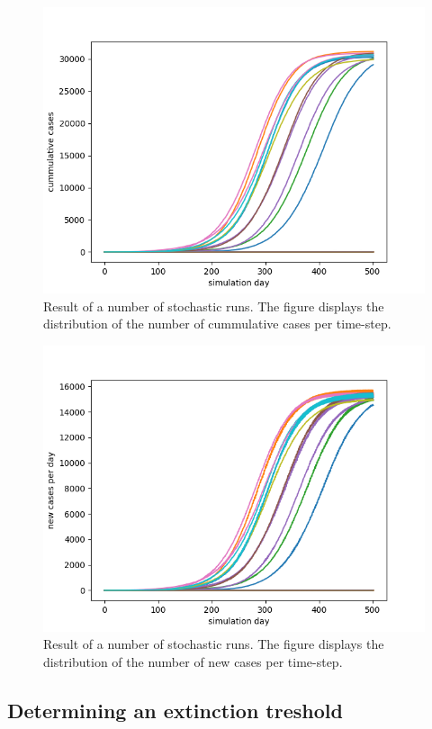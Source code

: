 \documentclass[runningheads]{llncs}
\begin{document}
\begin{figure}
	\includegraphics[width=\textwidth]{fig1.png}
	\caption{Result of a number of stochastic runs. The figure displays the distribution of the number of cummulative cases per time-step.} 	\label{fig1}
\end{figure}

\begin{figure}
	\includegraphics[width=\textwidth]{fig2.png}
	\caption{Result of a number of stochastic runs. The figure displays the distribution of the number of new cases per time-step.} 
	\label{fig2}
\end{figure}


\subsection{Determining an extinction treshold}
\end{document}
